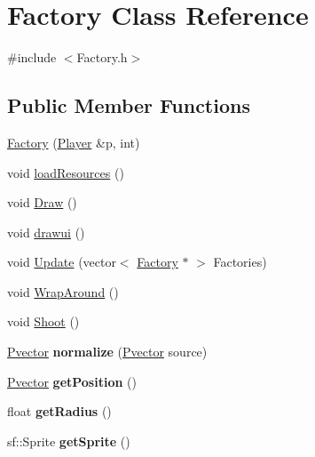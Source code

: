 \hypertarget{class_factory}{}\section{Factory Class Reference}
\label{class_factory}


{\ttfamily \#include $<$Factory.\+h$>$}

\subsection*{Public Member Functions}
\begin{DoxyCompactItemize}
\item 
\hyperlink{class_factory_a13a774bbec4f7dff63c3d4dc2d0cef44}{Factory} (\hyperlink{class_player}{Player} \&p, int)
\item 
void \hyperlink{class_factory_a433d35c5c9c48b697faeb776f5d4726b}{load\+Resources} ()
\item 
void \hyperlink{class_factory_a5680a4dcd72aa162c3e1df09eda2c37f}{Draw} ()
\item 
void \hyperlink{class_factory_ada7559deb820e8625a3b9abf387d96b6}{drawui} ()
\item 
void \hyperlink{class_factory_a7a517661c737ed703bfba46889db39c9}{Update} (vector$<$ \hyperlink{class_factory}{Factory} $\ast$ $>$ Factories)
\item 
void \hyperlink{class_factory_acbe7b19d6619d5c9e18b4ef856b816fa}{Wrap\+Around} ()
\item 
void \hyperlink{class_factory_a697846345794be734a2db63881b22639}{Shoot} ()
\item 
\hyperlink{class_pvector}{Pvector} {\bfseries normalize} (\hyperlink{class_pvector}{Pvector} source)\hypertarget{class_factory_a4d0a2b05fecfb9c828bf7706bb372f85}{}\label{class_factory_a4d0a2b05fecfb9c828bf7706bb372f85}

\item 
\hyperlink{class_pvector}{Pvector} {\bfseries get\+Position} ()\hypertarget{class_factory_a14fd4d196a4f0392c2ee8e8485404b47}{}\label{class_factory_a14fd4d196a4f0392c2ee8e8485404b47}

\item 
float {\bfseries get\+Radius} ()\hypertarget{class_factory_a2221e1d17c614154ef4cff652d8f9715}{}\label{class_factory_a2221e1d17c614154ef4cff652d8f9715}

\item 
sf\+::\+Sprite {\bfseries get\+Sprite} ()\hypertarget{class_factory_acd82a1a19ed336698d4b2ab4d6ab80fe}{}\label{class_factory_acd82a1a19ed336698d4b2ab4d6ab80fe}


\end{DoxyCompactItemize}
